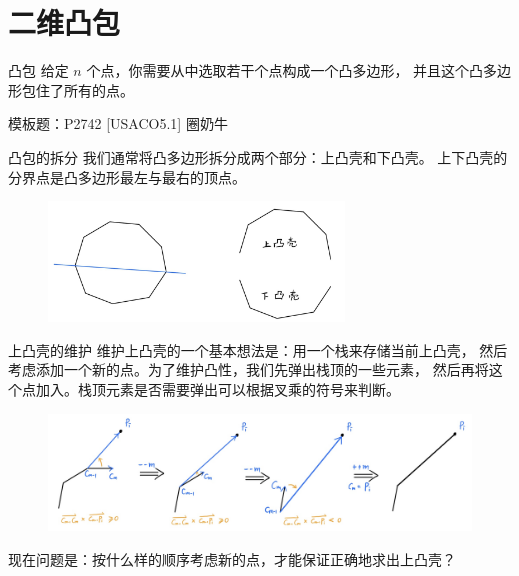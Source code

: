 \documentclass{beamer}
\begin{document}
\section{二维凸包}

\begin{frame}[fragile]{凸包}
    给定 $n$ 个点，你需要从中选取若干个点构成一个凸多边形，
    并且这个凸多边形包住了所有的点。

    \vspace{1em}
    模板题：P2742 [USACO5.1] 圈奶牛
\end{frame}

\begin{frame}[fragile]{凸包的拆分}
    我们通常将凸多边形拆分成两个部分：上凸壳和下凸壳。
    上下凸壳的分界点是凸多边形最左与最右的顶点。

    \begin{figure}
        \centering
        \includegraphics[width=0.7\textwidth]{pic/convex_split.jpg}
    \end{figure}
\end{frame}

\begin{frame}[fragile]{上凸壳的维护}
    \small
    维护上凸壳的一个基本想法是：用一个栈来存储当前上凸壳，
    然后考虑添加一个新的点。为了维护凸性，我们先弹出栈顶的一些元素，
    然后再将这个点加入。栈顶元素是否需要弹出可以根据叉乘的符号来判断。
    \pause
    \begin{figure}
        \centering
        \includegraphics[width=\textwidth]{pic/convex_addpoint.jpg}
    \end{figure}
    \pause

    现在问题是：按什么样的顺序考虑新的点，才能保证正确地求出上凸壳？
\end{frame}
\end{document}
